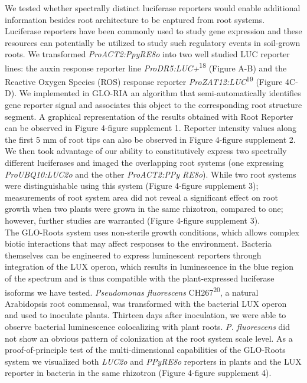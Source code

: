 \documentclass[]{article}
\begin{document}
We tested whether spectrally distinct luciferase reporters would enable
additional information besides root architecture to be captured from
root systems. Luciferase reporters have been commonly used to study gene
expression and these resources can potentially be utilized to study such
regulatory events in soil-grown roots. We transformed
\emph{ProACT2:PpyRE8o} into two well studied LUC reporter lines: the
auxin response reporter line \emph{ProDR5:LUC+}\textsuperscript{18}
(Figure A-B) and the Reactive Oxygen Species (ROS) response reporter
\emph{ProZAT12:LUC}\textsuperscript{19} (Figure 4C-D). We implemented in
GLO-RIA an algorithm that semi-automatically identifies gene reporter
signal and associates this object to the corresponding root structure
segment. A graphical representation of the results obtained with Root
Reporter can be observed in Figure 4-figure supplement 1. Reporter
intensity values along the first 5 mm of root tips can also be observed
in Figure 4-figure supplement 2. We then took advantage of our ability
to constitutively express two spectrally different luciferases and
imaged the overlapping root systems (one expressing
\emph{ProUBQ10:LUC2o} and the other \emph{ProACT2:PPy RE8o}). While two
root systems were distinguishable using this system (Figure 4-figure
supplement 3); measurements of root system area did not reveal a
significant effect on root growth when two plants were grown in the same
rhizotron, compared to one; however, further studies are warranted
(Figure 4-figure supplement 3).\\The GLO-Roots system uses non-sterile
growth conditions, which allows complex biotic interactions that may
affect responses to the environment. Bacteria themselves can be
engineered to express luminescent reporters through integration of the
LUX operon, which results in luminescence in the blue region of the
spectrum and is thus compatible with the plant-expressed luciferase
isoforms we have tested. \emph{Pseudomonas fluorescens}
CH267\textsuperscript{20}, a natural Arabidopsis root commensal, was
transformed with the bacterial LUX operon and used to inoculate plants.
Thirteen days after inoculation, we were able to observe bacterial
luminescence colocalizing with plant roots. \emph{P. fluorescens} did
not show an obvious pattern of colonization at the root system scale
level. As a proof-of-principle test of the multi-dimensional
capabilities of the GLO-Roots system we visualized both \emph{LUC2o} and
\emph{PPyRE8o} reporters in plants and the LUX reporter in bacteria in
the same rhizotron (Figure 4-figure supplement 4).
\end{document}
